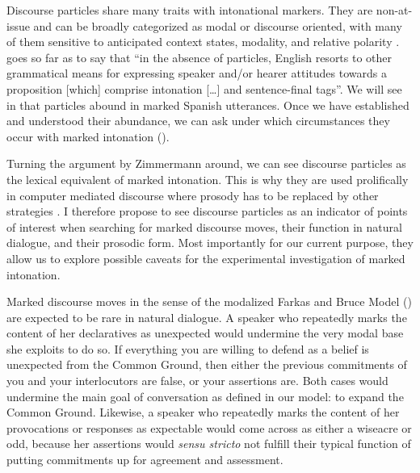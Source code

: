Discourse particles share many traits with intonational markers. They are non-at-issue and can be broadly categorized as modal or discourse oriented, with many of them sensitive to anticipated context states, modality, and relative polarity \citep[47--48]{Waltereit.2006}. \citet[2033--2034]{Zimmermann.2011} goes so far as to say that ``in the absence of particles, English resorts to other grammatical means for expressing speaker and/or hearer attitudes towards a proposition [which] comprise intonation [\ldots] and sentence-final tags''.  We will see in  that particles abound in marked Spanish utterances. Once we have established and understood their abundance, we can ask under which circumstances they occur with marked intonation ().

Turning the argument by Zimmermann around, we can see discourse particles as the lexical equivalent of marked intonation. This is why they are used prolifically in computer mediated discourse where prosody has to be replaced by other strategies \citep{Landone.2012}. I therefore propose to see discourse particles as an indicator of points of interest when searching for marked discourse moves, their function in natural dialogue, and their prosodic form. Most importantly for our current purpose, they allow us to explore possible caveats for the experimental investigation of marked intonation. 

Marked discourse moves in the sense of the modalized Farkas and Bruce Model () are expected to be rare in natural dialogue. A speaker who repeatedly marks the content of her declaratives as unexpected would undermine the very modal base she exploits to do so. If everything you are willing to defend as a belief is unexpected from the Common Ground, then either the previous commitments of you and your interlocutors are false, or your assertions are. Both cases would undermine the main goal of conversation as defined in our model: to expand the Common Ground. Likewise, a speaker who repeatedly marks the content of her provocations or responses as expectable would come across as either a wiseacre or odd, because her assertions would \textit{sensu stricto} not fulfill their typical function of putting commitments up for agreement and assessment.

